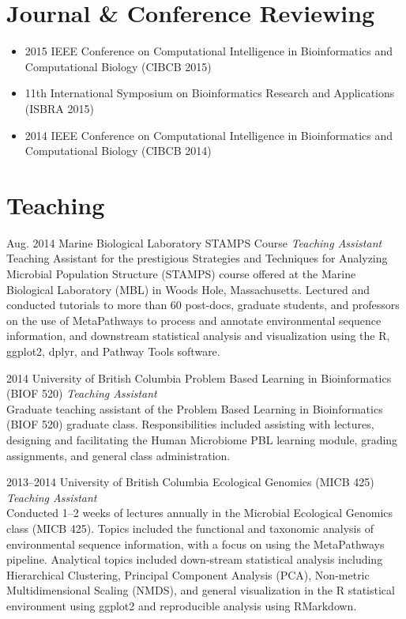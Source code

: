 \documentclass[print]{hanson_cv} %
\begin{document}
\section{Journal \& Conference Reviewing}
\begin{itemize}
\item 2015 IEEE Conference on Computational Intelligence in Bioinformatics and Computational Biology (CIBCB 2015)
\item 11th International Symposium on Bioinformatics Research and Applications (ISBRA 2015)
\item 2014 IEEE Conference on Computational Intelligence in Bioinformatics and Computational Biology (CIBCB 2014)
\end{itemize}

\section{Teaching}

\begin{entrylist}
\entry
{Aug. 2014}
{Marine Biological Laboratory}
{STAMPS Course}
{\emph{Teaching Assistant} \\
Teaching Assistant for the prestigious Strategies and Techniques for Analyzing Microbial Population Structure (STAMPS) course offered at the Marine Biological Laboratory (MBL) in Woods Hole, Massachusetts. Lectured and conducted tutorials to more than 60 post-docs, graduate students, and professors on the use of MetaPathways to process and annotate environmental sequence information, and downstream statistical analysis and visualization using the R, ggplot2, dplyr, and Pathway Tools software.}
\end{entrylist}
\begin{entrylist}
\entry
{2014}
{University of British Columbia}
{Problem Based Learning in Bioinformatics (BIOF 520)}
{\emph{Teaching Assistant} \\
Graduate teaching assistant of the Problem Based Learning in Bioinformatics (BIOF 520) graduate class. Responsibilities included assisting with lectures, designing and facilitating the Human Microbiome PBL learning module, grading assignments, and general class administration.}
\end{entrylist}
\begin{entrylist}
\entry
{2013--2014}
{University of British Columbia}
{Ecological Genomics (MICB 425)}
{\emph{Teaching Assistant} \\
Conducted 1--2 weeks of lectures annually in the Microbial
  Ecological Genomics class (MICB 425). Topics included the
  functional and taxonomic analysis of environmental sequence
  information, with a focus on using the MetaPathways pipeline. Analytical topics
  included down-stream statistical analysis including Hierarchical
  Clustering, Principal Component Analysis (PCA), Non-metric
  Multidimensional Scaling (NMDS), and general visualization in the R
  statistical environment using ggplot2 and reproducible analysis using RMarkdown.}
\end{entrylist}
\end{document}
